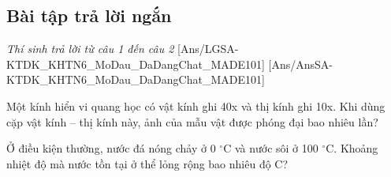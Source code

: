 \documentclass[FileMain.tex]{subfiles}
\begin{document}
\subsection{Bài tập trả lời ngắn}\textit{\large Thí sinh trả lời từ câu 1 đến câu 2}
[Ans/LGSA-KTDK_KHTN6_MoDau_DaDangChat_MADE101]
[Ans/AnsSA-KTDK_KHTN6_MoDau_DaDangChat_MADE101]
\setcounter{ex}{0}
\begin{ex}%
Một kính hiển vi quang học có vật kính ghi 40x và thị kính ghi 10x. Khi dùng cặp vật kính -- thị kính này, ảnh của mẫu vật được phóng đại bao nhiêu lần?
\end{ex}

\begin{ex}%
Ở điều kiện thường, nước đá nóng chảy ở 0 $^\circ$C và nước sôi ở 100 $^\circ$C. Khoảng nhiệt độ mà nước tồn tại ở thể lỏng rộng bao nhiêu độ C?
\end{ex}

\end{document}
